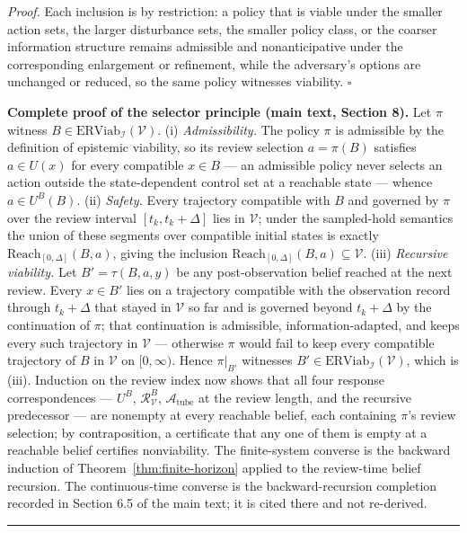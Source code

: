 \documentclass[11pt]{article}
\theoremstyle{definition}
\begin{document}
\emph{Proof.} Each inclusion is by restriction: a policy that is viable
under the smaller action sets, the larger disturbance sets, the smaller
policy class, or the coarser information structure remains admissible
and nonanticipative under the corresponding enlargement or refinement,
while the adversary's options are unchanged or reduced, so the same
policy witnesses viability. \ensuremath{\square}

\noindent\textbf{Complete proof of the selector principle (main text, Section 8).}
Let \(\pi\) witness \(B \in \mathrm{ERViab}_{\mathcal{I}}(\mathcal{V})\).
(i) \emph{Admissibility.} The policy \(\pi\) is admissible by the
definition of epistemic viability, so its review selection
\(a = \pi(B)\) satisfies \(a \in U(x)\) for every compatible
\(x \in B\) --- an admissible policy never selects an action outside the
state-dependent control set at a reachable state --- whence
\(a \in U^{B}(B)\). (ii) \emph{Safety.} Every trajectory compatible with
\(B\) and governed by \(\pi\) over the review interval \([t_{k},
t_{k} + \Delta]\) lies in \(\mathcal{V}\); under the sampled-hold
semantics the union of these segments over compatible initial states is
exactly \(\mathrm{Reach}_{[0,\Delta]}(B, a)\), giving the inclusion
\(\mathrm{Reach}_{[0,\Delta]}(B, a) \subseteq \mathcal{V}\). (iii)
\emph{Recursive viability.} Let \(B' = \tau(B, a, y)\) be any
post-observation belief reached at the next review. Every \(x \in B'\)
lies on a trajectory compatible with the observation record through
\(t_{k} + \Delta\) that stayed in \(\mathcal{V}\) so far and is governed
beyond \(t_{k} + \Delta\) by the continuation of \(\pi\); that
continuation is admissible, information-adapted, and keeps every such
trajectory in \(\mathcal{V}\) --- otherwise \(\pi\) would fail to keep
every compatible trajectory of \(B\) in \(\mathcal{V}\) on
\([0, \infty)\). Hence \(\pi|_{B'}\) witnesses
\(B' \in \mathrm{ERViab}_{\mathcal{I}}(\mathcal{V})\), which is (iii).
Induction on the review index now shows that all four response
correspondences --- \(U^{B}\), \(\mathcal{R}_{\mathcal{V}}^{B}\),
\(\mathcal{A}_{\mathrm{tube}}\) at the review length, and the recursive
predecessor --- are nonempty at every reachable belief, each containing
\(\pi\)'s review selection; by contraposition, a certificate that any
one of them is empty at a reachable belief certifies nonviability. The
finite-system converse is the backward induction of
Theorem~\ref{thm:finite-horizon} applied to the review-time belief
recursion. The continuous-time converse is the backward-recursion
completion recorded in Section 6.5 of the main text; it is cited there
and not re-derived. \rule{0.5\linewidth}{0.5pt}
\end{document}
